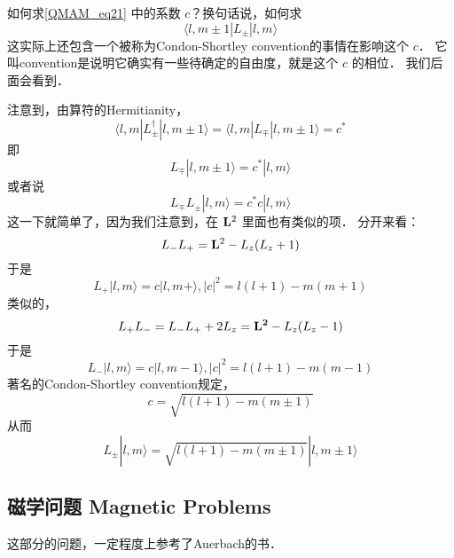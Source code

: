 \begin{exer}{}\label{QMAM_exe2}
如何求\autoref{QMAM_eq21} 中的系数 $c$？换句话说，如何求
\begin{equation}
\langle l,m\pm1|L_{\pm}|l,m\rangle
\end{equation}
这实际上还包含一个被称为Condon-Shortley convention的事情在影响这个 $c$． 它叫convention是说明它确实有一些待确定的自由度，就是这个 $c$ 的相位． 我们后面会看到．

注意到，由算符的Hermitianity，
\begin{equation}
\langle l,m|L_{\pm}^{\dagger}|l,m\pm1\rangle = \langle l,m|L_{\mp}|l,m\pm1\rangle = c^*
\end{equation}
即
\begin{equation}
L_{\mp}|l,m\pm1\rangle = c^*|l,m\rangle
\end{equation}
或者说
\begin{equation}
L_{\mp}L_{\pm}|l,m\rangle = c^*c|l,m\rangle
\end{equation}
这一下就简单了，因为我们注意到，在 ${\bf L}^2$ 里面也有类似的项． 分开来看：
\begin{equation}
L_-L_+ = {\bf L}^2 - L_z(L_z+1)
\end{equation}
于是
\begin{equation}
L_+|l,m\rangle = c|l,m+\rangle, |c|^2 = l(l+1)-m(m+1)
\end{equation}
类似的，
\begin{equation}
L_+L_- = L_-L_+ +2L_z = {\bf L^2} -L_z(L_z-1)
\end{equation}
于是
\begin{equation}
L_-|l,m\rangle = c|l,m-1\rangle, |c|^2 = l(l+1)-m(m-1) 
\end{equation}
著名的Condon-Shortley convention规定，
\begin{equation}
c = \sqrt{l(l+1) - m(m\pm1)}
\end{equation}
从而
\begin{equation}
L_{\pm}|l,m\rangle = \sqrt{l(l+1) - m(m\pm 1)}|l,m\pm1\rangle
\end{equation}
\end{exer}

\subsection{磁学问题 Magnetic Problems}

这部分的问题，一定程度上参考了Auerbach的书\cite{Auerbach}．